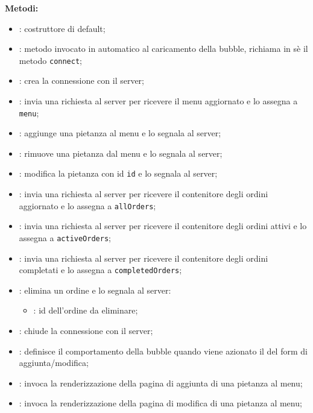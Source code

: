 \textbf{Metodi:}
\begin{itemize}
	\item {}: costruttore di default;
	\item {}: metodo invocato in automatico al caricamento della bubble, richiama in sè il metodo \texttt{connect};
	\item {}: crea la connessione con il server;
	\item {}: invia una richiesta al server per ricevere il menu aggiornato e lo assegna a \texttt{menu};
	\item {}: aggiunge una pietanza al menu e lo segnala al server;
	\item {}: rimuove una pietanza dal menu e lo segnala al server;
	\item {}: modifica la pietanza con id \texttt{id} e lo segnala al server;
	\item {}: invia una richiesta al server per ricevere il contenitore degli ordini aggiornato e lo assegna a \texttt{allOrders};
	\item {}: invia una richiesta al server per ricevere il contenitore degli ordini attivi e lo assegna a \texttt{activeOrders};
	\item {}: invia una richiesta al server per ricevere il contenitore degli ordini completati e lo assegna a \texttt{completedOrders};
	\item {}: elimina un ordine e lo segnala al server:
	\begin{itemize}
		\item {}: id dell'ordine da eliminare;
	\end{itemize}
	\item {}: chiude la connessione con il server;
	\item {}: definisce il comportamento della bubble quando viene azionato il  del form di aggiunta/modifica;
	\item {}: invoca la renderizzazione della pagina di aggiunta di una pietanza al menu;
	\item {}: invoca la renderizzazione della pagina di modifica di una pietanza al menu;

\end{itemize}
